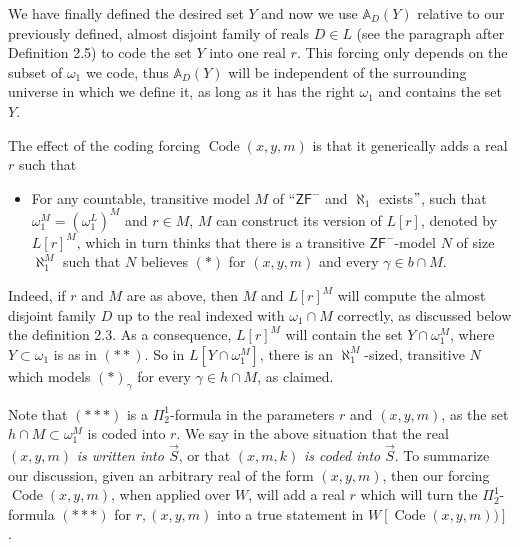 \documentclass[a4paper,11pt]{article}
\newcommand{\ZFP}{\mathsf{ZF}^-}
\begin{document}
We have finally defined the desired set $Y$ and now we use 
\(\mathbb{A}_D (Y) \)
 relative to our previously defined, almost disjoint family of reals $D \in  L $ (see the paragraph after Definition 2.5)  to code the set $Y$ into one real $r$. This forcing only depends on the subset of $\omega_1$ we code, thus $\mathbb{A}_D(Y)$ will be independent of the surrounding universe in which we define it, as long as it has the right $\omega_1$ and contains the set $Y$.

The effect of the coding forcing $\operatorname{Code} (x,y,m)$ is that it generically adds a real $r$ such that
\begin{itemize}
\item[$({\ast}{\ast}{\ast})$] For any countable, transitive model $M$ of ``$\ZFP$ and $\aleph_1$ exists$"$, such that $\omega_1^M=(\omega_1^L)^M$ and $ r  \in M$, $M$ can construct its version of $L[r]$, denoted by $L[r]^M$, which in turn thinks that there is a transitive $\ZFP$-model $N$ of size $\aleph_1^M$  such that $N$ believes $(\ast)$ for $(x,y,m)$ and every $\gamma \in b \cap M$.
\end{itemize}

Indeed, if $r$ and $M$ are as above, then $M$ and $L[r]^M$ will compute the almost disjoint family $D$ up to the real indexed with $\omega_1 \cap M$ correctly, as discussed below the definition 2.3. As a consequence, $L[r]^M$ will contain the set $Y \cap \omega_1^M$, where $Y \subset \omega_1$ is as in $(\ast\ast)$. So in $L[Y \cap \omega_1^M]$, there is an $\aleph_1^M$-sized, transitive $N$ which models $(\ast)_{\gamma}$ for every $\gamma \in h \cap M$, as claimed.


Note that $({\ast} {\ast} {\ast})$ is a $\Pi^1_2$-formula in the parameters $r$ and $(x,y,m)$, as the set $h \cap M \subset \omega_1^M$ is coded into $r$. We say in the above situation that the real $(x,y,m)$ \emph{ is written into $\vec{S}$}, or that $(x,m,k)$ \emph{is coded into} $\vec{S}$. To summarize our discussion, given an arbitrary real of the form $(x,y,m)$, then our forcing $\operatorname{Code} (x,y,m)$, when applied over $W$, will add a real $r$ which will turn the $\Pi^1_2$-formula $({\ast} {\ast}{\ast})$ for $r,(x,y,m)$ into a true statement in $W[\operatorname{Code} (x,y,m))]$.
\end{document}
